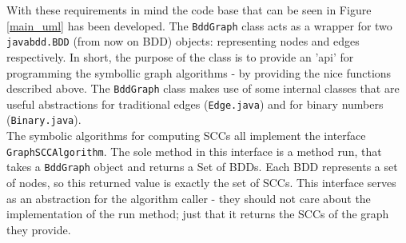 \documentclass[../master/master.tex]{subfiles}
\begin{document}
With these requirements in mind the code base that can be seen in Figure \ref{main_uml} has been developed. The \texttt{BddGraph} class acts as a wrapper for two \texttt{javabdd.BDD} (from now on BDD) objects: representing nodes and edges respectively. In short, the purpose of the class is to provide an 'api' for programming the symbollic graph algorithms - by providing the nice functions described above. The \texttt{BddGraph} class makes use of some internal classes that are useful abstractions for traditional edges (\texttt{Edge.java}) and for binary numbers (\texttt{Binary.java}).\\

The symbolic algorithms for computing SCCs all implement the interface \texttt{GraphSCCAlgorithm}. The sole method in this interface is a method run, that takes a \texttt{BddGraph} object and returns a Set of BDDs. Each BDD represents a set of nodes, so this returned value is exactly the set of SCCs. This interface serves as an abstraction for the algorithm caller - they should not care about the implementation of the run method; just that it returns the SCCs of the graph they provide.
\end{document}
